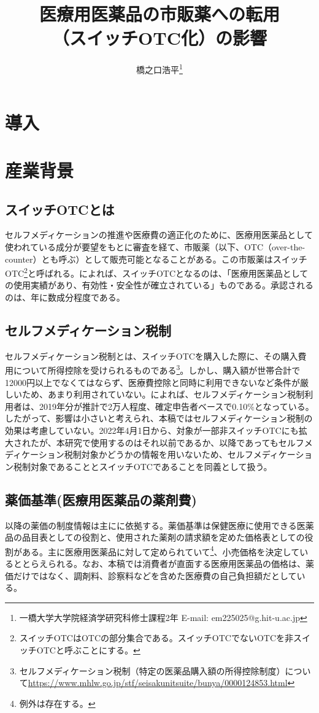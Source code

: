 \documentclass[a4paper,11pt,uplatex]{jsarticle}
\title{\vspace{-3cm}医療用医薬品の市販薬への転用\\（スイッチOTC化）の影響}
\author{橋之口浩平\thanks{一橋大学大学院経済学研究科修士課程2年 E-mail: em225025@g.hit-u.ac.jp}}
\date{}
\theoremstyle{definition}
\begin{document}
\maketitle{}
\section{導入}
\section{産業背景}
\subsection{スイッチOTCとは}
セルフメディケーションの推進や医療費の適正化のために、医療用医薬品として使われている成分が要望をもとに審査を経て、市販薬（以下、OTC（over-the-counter）とも呼ぶ）として販売可能となることがある。この市販薬はスイッチOTC\footnote{スイッチOTCはOTCの部分集合である。スイッチOTCでないOTCを非スイッチOTCと呼ぶことにする。}と呼ばれる。\cite{jmsi2020}によれば、スイッチOTCとなるのは、「医療用医薬品としての使用実績があり、有効性・安全性が確立されている」ものである。承認されるのは、年に数成分程度である。
\subsection{セルフメディケーション税制}
セルフメディケーション税制とは、スイッチOTCを購入した際に、その購入費用について所得控除を受けられるものである\footnote{セルフメディケーション税制（特定の医薬品購入額の所得控除制度）について\url{https://www.mhlw.go.jp/stf/seisakunitsuite/bunya/0000124853.html}}。しかし、購入額が世帯合計で12000円以上でなくてはならず、医療費控除と同時に利用できないなど条件が厳しいため、あまり利用されていない。\cite{jmsi2021}によれば、セルフメディケーション税制利用者は、2019年分が推計で2万人程度、確定申告者ベースで0.10\%となっている。したがって、影響は小さいと考えられ、本稿ではセルフメディケーション税制の効果は考慮していない。2022年4月1日から、対象が一部非スイッチOTCにも拡大されたが、本研究で使用するのはそれ以前であるか、以降であってもセルフメディケーション税制対象かどうかの情報を用いないため、セルフメディケーション税制対象であることとスイッチOTCであることを同義として扱う。
\subsection{薬価基準(医療用医薬品の薬剤費)}
以降の薬価の制度情報は主に\cite{takahashi}に依拠する。薬価基準は保健医療に使用できる医薬品の品目表としての役割と、使用された薬剤の請求額を定めた価格表としての役割がある。主に医療用医薬品に対して定められていて\footnote{例外は存在する。}、小売価格を決定しているととらえられる。なお、本稿では消費者が直面する医療用医薬品の価格は、薬価だけではなく、調剤料、診察料などを含めた医療費の自己負担額だとしている。
\end{document}
